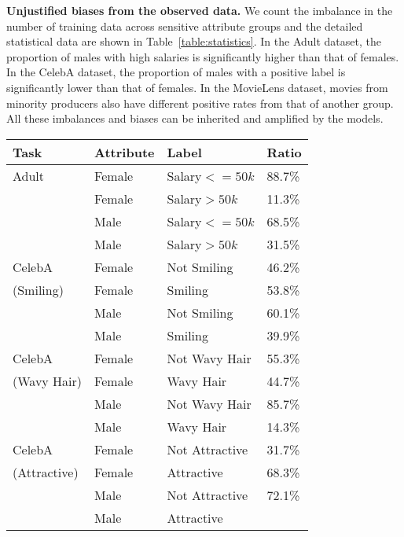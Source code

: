 \documentclass[letterpaper]{article} %
\begin{document}
\noindent\textbf{Unjustified biases from the observed data.} We count the imbalance in the number of training data across sensitive attribute groups and the detailed statistical data are shown in Table~\ref{table:statistics}. In the Adult dataset, the proportion of males with high salaries is significantly higher than that of females. In the CelebA dataset, the proportion of males with a positive label is significantly lower than that of females. In the MovieLens dataset, movies from minority producers also have different positive rates from that of another group. All these imbalances and biases can be inherited and amplified by the models.


\begin{table}[t]
    \centering\small
        \begin{tabular}{llll}
         \hline\hline
        Task & Attribute & Label %
        &Ratio   \\
        \hline
        Adult & Female&	Salary$<=50k$	%
        &88.7\%\\
        &Female&	Salary$>50k$ %
        &11.3\%\\
        & Male&	Salary$<=50k$	%
        &68.5\%\\        
        & Male&	Salary$>50k$	%
        &31.5\%\\         
        \hline
        CelebA & Female& Not Smiling %
        &46.2\%\\
        (Smiling) & Female& Smiling %
        &53.8\%\\
        & Male& Not Smiling %
        &60.1\%\\
        & Male& Smiling %
        &39.9\% \\
        \hline
        CelebA  & Female&	Not Wavy Hair %
        &55.3\%\\
        (Wavy Hair) & Female& Wavy Hair %
        &44.7\%\\
        & Male&	Not Wavy Hair %
        &85.7\%\\
        & Male& Wavy Hair %
        &14.3\%\\ 
        \hline
        CelebA  & Female &	Not Attractive	%
        &31.7\%\\
        (Attractive) & Female&Attractive	%
        &68.3\%\\
        &Male&Not Attractive	%
        &72.1\%\\
        &Male& Attractive	%

\end{tabular}
\end{table}
\end{document}
